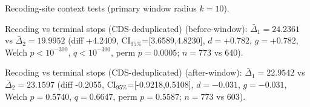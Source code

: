 Recoding-site context tests (primary window radius $k=10$).

Recoding vs terminal stops (CDS-deduplicated) (before-window): $\bar{\Delta}_1=24.2361$ vs $\bar{\Delta}_2=19.9952$ (diff +4.2409, CI$_{95\%}$=[3.6589,4.8230], $d=+0.782$, $g=+0.782$, Welch $p<10^{-300}$, $q<10^{-300}$, perm $p=0.0005$; $n=773$ vs 640).

Recoding vs terminal stops (CDS-deduplicated) (after-window): $\bar{\Delta}_1=22.9542$ vs $\bar{\Delta}_2=23.1597$ (diff -0.2055, CI$_{95\%}$=[-0.9218,0.5108], $d=-0.031$, $g=-0.031$, Welch $p=0.5740$, $q=0.6647$, perm $p=0.5587$; $n=773$ vs 603).
